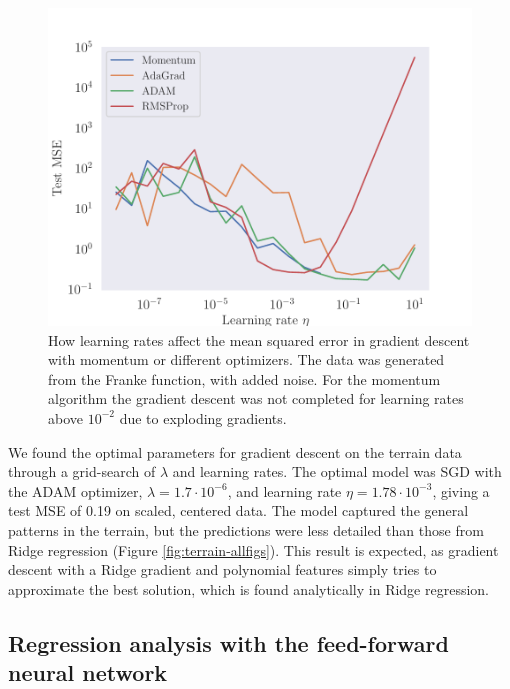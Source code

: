 \begin{figure}
    \centering
    \includegraphics[width=0.99\linewidth]{examples/tests_even/figs/Franke-learningrates-optimizers.pdf}
    \caption{How learning rates affect the mean squared error in gradient descent with momentum or different optimizers. The data was generated from the Franke function, with added noise. For the momentum algorithm the gradient descent was not completed for learning rates above $10^{-2}$ due to exploding gradients.}
    \label{fig:franke-learningrate}
\end{figure}

We found the optimal parameters for gradient descent on the terrain data through a grid-search of $\lambda$ and learning rates. The optimal model was SGD with the ADAM optimizer, $\lambda=1.7\cdot10^{-6}$, and learning rate $\eta=1.78\cdot10^{-3}$, giving a test MSE of 0.19 on scaled, centered data. The model captured the general patterns in the terrain, but the predictions were less detailed than those from Ridge regression (Figure \ref{fig:terrain-allfigs}). This result is expected, as gradient descent with a Ridge gradient and polynomial features simply tries to approximate the best solution, which is found analytically in Ridge regression.

\subsection{Regression analysis with the feed-forward neural network}



